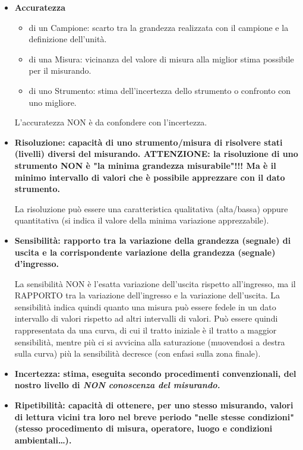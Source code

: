 \documentclass[a4paper,11pt]{report}
\begin{document}
\begin{itemize}
  \item \bf Accuratezza\rm
  \begin{itemize}
    \item di un Campione: scarto tra la grandezza realizzata con il campione e la definizione dell'unità.
    \item di una Misura: vicinanza del valore di misura alla miglior stima possibile per il misurando.
    \item di uno Strumento: stima dell'incertezza dello strumento o confronto con uno migliore.
  \end{itemize}
  L'accuratezza NON è da confondere con l'incertezza.
  \item \bf Risoluzione\rm: capacità di uno strumento/misura di risolvere stati (livelli) diversi del misurando. ATTENZIONE: la risoluzione di uno strumento NON è "la minima grandezza misurabile"!!! Ma è il minimo intervallo di valori che è possibile apprezzare con il dato strumento.
  
  La risoluzione può essere una caratteristica qualitativa (alta/bassa) oppure quantitativa (si indica il valore della minima variazione apprezzabile).
  
  \item \bf Sensibilità\rm: rapporto tra la variazione della grandezza (segnale) di uscita e la corrispondente variazione della grandezza (segnale) d'ingresso.
  
  La sensibilità NON è l'esatta variazione dell'uscita rispetto all'ingresso, ma il RAPPORTO tra la variazione dell'ingresso e la variazione dell'uscita. La sensibilità indica quindi quanto una misura può essere fedele in un dato intervallo di valori rispetto ad altri intervalli di valori. Può essere quindi rappresentata da una curva, di cui il tratto iniziale è il tratto a maggior sensibilità, mentre più ci si avvicina alla saturazione (muovendosi a destra sulla curva) più la sensibilità decresce (con enfasi sulla zona finale).
  
  \item \bf Incertezza\rm: stima, eseguita secondo procedimenti convenzionali, del nostro livello di \it NON \rm conoscenza del misurando.
  
  \item \bf Ripetibilità\rm: capacità di ottenere, per uno stesso misurando, valori di lettura vicini tra loro \bf nel breve periodo \rm "nelle stesse condizioni" (stesso procedimento di misura, operatore, luogo e condizioni ambientali\dots).
  

\end{itemize}
\end{document}
